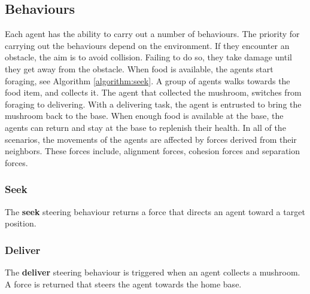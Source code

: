\subsection{Behaviours} \label{subsection:behaviours}
Each agent has the ability to carry out a number of behaviours. 
The priority for carrying out the behaviours depend on the environment.
If they encounter an obstacle, the aim is to avoid collision.
Failing to do so, they take damage until they get away from the obstacle.
When food is available, the agents start foraging, see Algorithm \ref{algorithm:seek}. 
A group of agents walks towards the food item, and collects it.
The agent that collected the mushroom, switches from foraging to delivering.
With a delivering task, the agent is entrusted to bring the mushroom back to the base.
When enough food is available at the base, the agents can return and stay at the base to replenish their health.
In all of the scenarios, the movements of the agents are affected by forces derived from their neighbors.
These forces include, alignment forces, cohesion forces and separation forces.


\subsubsection*{Seek}
The \textbf{seek} steering behaviour returns a force that directs an agent toward a target position.





\subsubsection*{Deliver}
The \textbf{deliver} steering behaviour is triggered when an agent collects a mushroom.
A force is returned that steers the agent towards the home base.

